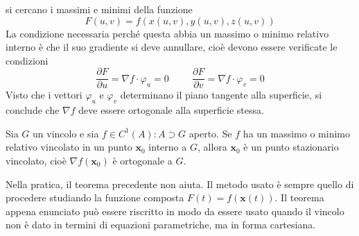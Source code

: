 \documentclass[10pt, a4paper]{scrartcl}
\theoremstyle{definition}
\numberwithin{esempio}{section}
\theoremstyle{definition}
\numberwithin{obs}{section}
\numberwithin{nota}{section}
\numberwithin{equation}{subsection}
\begin{document}
si cercano i massimi e minimi della funzione
\[
F(u,v) = f(x(u,v) , y(u,v), z(u,v))
\] 
La condizione necessaria perch\'e questa abbia un massimo o minimo relativo interno \`e che il suo gradiente si deve annullare, cio\`e devono essere verificate le condizioni 
\begin{equation}
	\frac{\partial F}{\partial u} = \nabla f \cdot \varphi _u = 0 \hspace{1cm}\frac{\partial F}{\partial v} = \nabla f\cdot \varphi _v = 0
\end{equation}
Visto che i vettori $\varphi _u$ e $\varphi _v$ determinano il piano tangente alla superficie, si conclude che $\nabla f$ deve essere ortogonale alla superficie stessa. 
\begin{teorema}
	{}{}
	Sia $G$ un vincolo e sia $f \in C^1(A): A \supset G $ aperto. 
	Se $f$ ha un massimo o minimo relativo vincolato in un punto $\mathbf{x} _0 $ interno a $G$, allora $\mathbf{x} _0$ \`e un punto stazionario vincolato, cio\`e $\nabla f(\mathbf{x} _0)$ \`e ortogonale a $G$.
\end{teorema}
Nella pratica, il teorema precedente non aiuta. 
Il metodo usato \`e sempre quello di procedere studiando la funzione composta $F (t) = f(\mathbf{x} (t))$.
Il teorema appena enunciato pu\`o essere riscritto in modo da essere usato quando il vincolo non \`e dato in termini di equazioni parametriche, ma in forma cartesiana.
\end{document}

